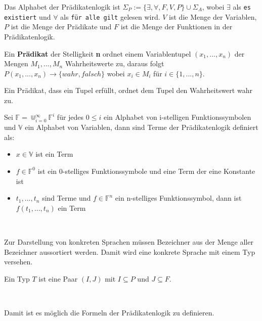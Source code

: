 \begin{defi}
  Das Alphabet der Prädikatenlogik ist $\Sigma_P := \{\exists,\forall,F,V,P\} \cup \Sigma_A$, wobei
  $\exists$ als \texttt{es existiert} und $\forall$ als \texttt{für alle gilt} gelesen wird.
  $V$ ist die Menge der Variablen, $P$ ist die Menge der Prädikate und $F$ ist die Menge der
  Funktionen in der Prädikatenlogik.
\end{defi}

\begin{defi}
  Ein \textbf{Prädikat} der Stelligkeit \textbf{n} ordnet einem Variablentupel
  $(x_1,...,x_n)$ der Mengen $M_1,...,M_n$ Wahrheitswerte zu, daraus folgt
  $P(x_1,...,x_n) \rightarrow \{wahr, falsch\}$ wobei $x_i\in M_i$ für $i\in \{1,...,n\}$.
\end{defi}
Ein Prädikat, dass ein Tupel erfüllt, ordnet dem Tupel den Wahrheitswert wahr zu.

\begin{defi}
  Sei $\mathbb{F}=\Cup^{\infty}_{i=0}\mathbb{F}^i$ für jedes $0\le i$ ein Alphabet von
  i-stelligen Funktionssymbolen und $\mathbb{V}$ ein Alphabet von Variablen,
  dann sind Terme der Prädikatenlogik definiert als:
  \begin{itemize}
  \item $x\in\mathbb{V}$ ist ein Term
  \item $f\in\mathbb{F}^0$ ist ein 0-stelliges Funktionssymbole und eine Term der
    eine Konstante ist
  \item $t_1,...,t_n$ sind Terme und $f\in\mathbb{F}^n$ ein n-stelliges
    Funktionssymbol, dann ist $f(t_1,...,t_n)$ ein Term
  \end{itemize}  
\end{defi}~\cite{kreitz1994automatisierte}

Zur Darstellung von konkreten Sprachen müssen Bezeichner aus der Menge aller
Bezeichner aussortiert werden. Damit wird eine konkrete Sprache mit einem Typ
versehen.
\begin{defi}
  Ein Typ $T$ ist eine Paar $(I,J)$ mit $I\subseteq P$ und $J\subseteq F$.
\end{defi}~\cite{heinemann2013logik}

Damit ist es möglich die Formeln der Prädikatenlogik zu definieren.

